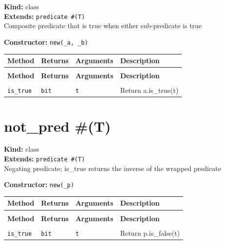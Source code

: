 \documentclass[11pt,letterpaper]{report}
\begin{document}
\noindent\textbf{Kind:} class\\
\noindent\textbf{Extends:} \texttt{predicate \#(T)}\\
\noindent Composite predicate that is true when either sub-predicate is true

\noindent\textbf{Constructor:} \texttt{new(\_a, \_b)}

\begin{xltabular}{\linewidth}{>{\small}p{1.35in} >{\small}p{1.25in} >{\small}p{0.95in} >{\small}X}
\toprule
\textbf{Method} & \textbf{Returns} & \textbf{Arguments} & \textbf{Description} \\
\midrule
\endfirsthead
{} \\
\midrule
\textbf{Method} & \textbf{Returns} & \textbf{Arguments} & \textbf{Description} \\
\midrule
\endhead
\midrule
{} \\
\endfoot
\bottomrule
\endlastfoot
\texttt{is\_true} & \texttt{bit} & \texttt{t} & Return a.is\_true(t) \\
\end{xltabular}

\section{not\_pred \#(T)}
\label{cls:notpredT}

\noindent\textbf{Kind:} class\\
\noindent\textbf{Extends:} \texttt{predicate \#(T)}\\
\noindent Negating predicate; is\_true returns the inverse of the wrapped predicate

\noindent\textbf{Constructor:} \texttt{new(\_p)}

\begin{xltabular}{\linewidth}{>{\small}p{1.35in} >{\small}p{1.25in} >{\small}p{0.95in} >{\small}X}
\toprule
\textbf{Method} & \textbf{Returns} & \textbf{Arguments} & \textbf{Description} \\
\midrule
\endfirsthead
{} \\
\midrule
\textbf{Method} & \textbf{Returns} & \textbf{Arguments} & \textbf{Description} \\
\midrule
\endhead
\midrule
{} \\
\endfoot
\bottomrule
\endlastfoot
\texttt{is\_true} & \texttt{bit} & \texttt{t} & Return p.is\_false(t) \\
\end{xltabular}
\end{document}
